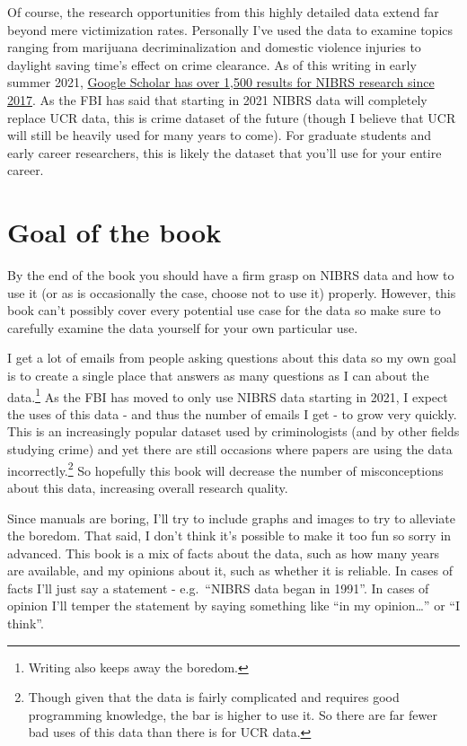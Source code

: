 \documentclass[
  12pt,
  openany]{book}
\begin{document}
Of course, the research opportunities from this highly detailed data extend far beyond mere victimization rates. Personally I've used the data to examine topics ranging from marijuana decriminalization and domestic violence injuries to daylight saving time's effect on crime clearance. As of this writing in early summer 2021, \href{https://scholar.google.com/scholar?as_ylo=2017\&q=NIBRS\&hl=en\&as_sdt=0,44}{Google Scholar has over 1,500 results for NIBRS research since 2017}. As the FBI has said that starting in 2021 NIBRS data will completely replace UCR data, this is crime dataset of the future (though I believe that UCR will still be heavily used for many years to come). For graduate students and early career researchers, this is likely the dataset that you'll use for your entire career.

\hypertarget{goal-of-the-book}{%
\section{Goal of the book}\label{goal-of-the-book}}

By the end of the book you should have a firm grasp on NIBRS data and how to use it (or as is occasionally the case, choose not to use it) properly. However, this book can't possibly cover every potential use case for the data so make sure to carefully examine the data yourself for your own particular use.

I get a lot of emails from people asking questions about this data so my own goal is to create a single place that answers as many questions as I can about the data.\footnote{Writing also keeps away the boredom.} As the FBI has moved to only use NIBRS data starting in 2021, I expect the uses of this data - and thus the number of emails I get - to grow very quickly. This is an increasingly popular dataset used by criminologists (and by other fields studying crime) and yet there are still occasions where papers are using the data incorrectly.\footnote{Though given that the data is fairly complicated and requires good programming knowledge, the bar is higher to use it. So there are far fewer bad uses of this data than there is for UCR data.} So hopefully this book will decrease the number of misconceptions about this data, increasing overall research quality.

Since manuals are boring, I'll try to include graphs and images to try to alleviate the boredom. That said, I don't think it's possible to make it too fun so sorry in advanced. This book is a mix of facts about the data, such as how many years are available, and my opinions about it, such as whether it is reliable. In cases of facts I'll just say a statement - e.g.~``NIBRS data began in 1991''. In cases of opinion I'll temper the statement by saying something like ``in my opinion\ldots{}'' or ``I think''.
\end{document}
